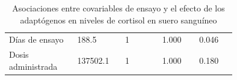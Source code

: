 \begin{table}[H]

\caption{Asociaciones entre covariables de ensayo y el efecto de los adaptógenos en niveles de cortisol en suero sanguíneo}
\label{tab:covariables_cortisol}

\begin{threeparttable}

{\centering\small{}

\begin{tabular}{M{0.2\linewidth}M{0.1375\linewidth}M{0.1375\linewidth}M{0.1375\linewidth}M{0.1375\linewidth}}\hline

    \theader{} &  &  &  &  \\ \hline
    
    Días de ensayo & 188.5 & 1 & 1.000 & 0.046 \\
    Dosis administrada & 137502.1 & 1 & 1.000 & 0.180 \\

    \hline
\end{tabular}

}

\begin{tablenotes}\tiny %
    \item[] 
\end{tablenotes}

\end{threeparttable}
\end{table}